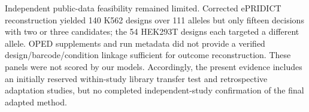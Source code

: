 Independent public-data feasibility remained limited. Corrected ePRIDICT reconstruction yielded 140 K562 designs over 111 alleles but only fifteen decisions with two or three candidates; the 54 HEK293T designs each targeted a different allele. OPED supplements and run metadata did not provide a verified design/barcode/condition linkage sufficient for outcome reconstruction. These panels were not scored by our models. Accordingly, the present evidence includes an initially reserved within-study library transfer test and retrospective adaptation studies, but no completed independent-study confirmation of the final adapted method.
\FloatBarrier
